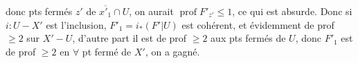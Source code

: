 
donc  pts fermés $z'$ de $\overline{x'_1}\cap U$, on
aurait $\operatorname{prof}F'_{z'}\leq1$, ce qui est absurde. Donc
si $i:U\mathbin{-}X'$ est l'inclusion, $F'_1=i_*(F'|U)$
est cohérent, et évidemment de prof $\ge2$
sur $X'-U$, d'autre part il est de prof $\ge2$
aux pts fermés de  $U$, donc
$F'_1$ est de prof $\ge2$ en \uline{$\forall$} pt fermé de $X'$,
on a gagné.

